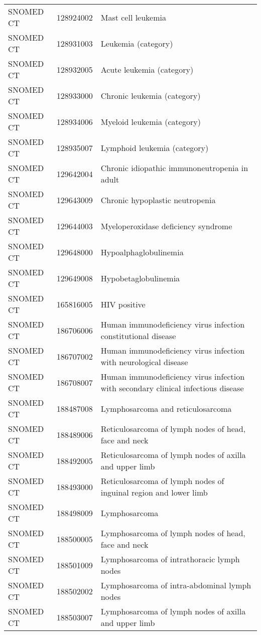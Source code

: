 \begin{longtable}{p{}p{}p{}}
  SNOMED CT & 128924002 & Mast cell leukemia \\ 
  SNOMED CT & 128931003 & Leukemia (category) \\ 
  SNOMED CT & 128932005 & Acute leukemia (category) \\ 
  SNOMED CT & 128933000 & Chronic leukemia (category) \\ 
  SNOMED CT & 128934006 & Myeloid leukemia (category) \\ 
  SNOMED CT & 128935007 & Lymphoid leukemia (category) \\ 
  SNOMED CT & 129642004 & Chronic idiopathic immunoneutropenia in adult \\ 
  SNOMED CT & 129643009 & Chronic hypoplastic neutropenia \\ 
  SNOMED CT & 129644003 & Myeloperoxidase deficiency syndrome \\ 
  SNOMED CT & 129648000 & Hypoalphaglobulinemia \\ 
  SNOMED CT & 129649008 & Hypobetaglobulinemia \\ 
  SNOMED CT & 165816005 & HIV positive \\ 
  SNOMED CT & 186706006 & Human immunodeficiency virus infection constitutional disease \\ 
  SNOMED CT & 186707002 & Human immunodeficiency virus infection with neurological disease \\ 
  SNOMED CT & 186708007 & Human immunodeficiency virus infection with secondary clinical infectious disease \\ 
  SNOMED CT & 188487008 & Lymphosarcoma and reticulosarcoma \\ 
  SNOMED CT & 188489006 & Reticulosarcoma of lymph nodes of head, face and neck \\ 
  SNOMED CT & 188492005 & Reticulosarcoma of lymph nodes of axilla and upper limb \\ 
  SNOMED CT & 188493000 & Reticulosarcoma of lymph nodes of inguinal region and lower limb \\ 
  SNOMED CT & 188498009 & Lymphosarcoma \\ 
  SNOMED CT & 188500005 & Lymphosarcoma of lymph nodes of head, face and neck \\ 
  SNOMED CT & 188501009 & Lymphosarcoma of intrathoracic lymph nodes \\ 
  SNOMED CT & 188502002 & Lymphosarcoma of intra-abdominal lymph nodes \\ 
  SNOMED CT & 188503007 & Lymphosarcoma of lymph nodes of axilla and upper limb \\ 

\end{longtable}
